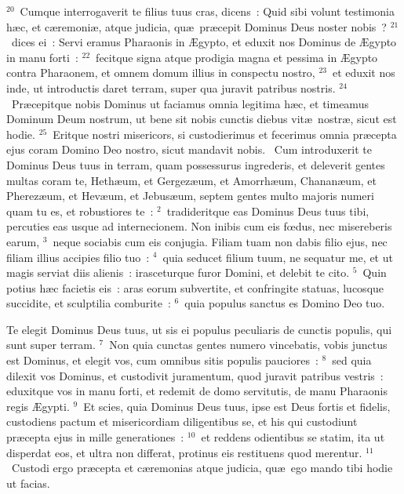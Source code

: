 ${}^{20}$~Cumque interrogaverit te filius tuus cras, dicens~: Quid sibi volunt testimonia h\ae c, et c\ae remoni\ae , atque judicia, qu\ae\ pr\ae cepit Dominus Deus noster nobis~?
${}^{21}$~dices ei~: Servi eramus Pharaonis in \AE gypto, et eduxit nos Dominus de \AE gypto in manu forti~:
${}^{22}$~fecitque signa atque prodigia magna et pessima in \AE gypto contra Pharaonem, et omnem domum illius in conspectu nostro,
${}^{23}$~et eduxit nos inde, ut introductis daret terram, super qua juravit patribus nostris.
${}^{24}$~Pr\ae cepitque nobis Dominus ut faciamus omnia legitima h\ae c, et timeamus Dominum Deum nostrum, ut bene sit nobis cunctis diebus vit\ae\ nostr\ae , sicut est hodie.
${}^{25}$~Eritque nostri misericors, si custodierimus et fecerimus omnia pr\ae cepta ejus coram Domino Deo nostro, sicut mandavit nobis.
~Cum introduxerit te Dominus Deus tuus in terram, quam possessurus ingrederis, et deleverit gentes multas coram te, Heth\ae um, et Gergez\ae um, et Amorrh\ae um, Chanan\ae um, et Pherez\ae um, et Hev\ae um, et Jebus\ae um, septem gentes multo majoris numeri quam tu es, et robustiores te~:
${}^{2}$~tradideritque eas Dominus Deus tuus tibi, percuties eas usque ad internecionem. Non inibis cum eis fœdus, nec misereberis earum,
${}^{3}$~neque sociabis cum eis conjugia. Filiam tuam non dabis filio ejus, nec filiam illius accipies filio tuo~:
${}^{4}$~quia seducet filium tuum, ne sequatur me, et ut magis serviat diis alienis~: irasceturque furor Domini, et delebit te cito.
${}^{5}$~Quin potius h\ae c facietis eis~: aras eorum subvertite, et confringite statuas, lucosque succidite, et sculptilia comburite~:
${}^{6}$~quia populus sanctus es Domino Deo tuo.

 Te elegit Dominus Deus tuus, ut sis ei populus peculiaris de cunctis populis, qui sunt super terram.
${}^{7}$~Non quia cunctas gentes numero vincebatis, vobis junctus est Dominus, et elegit vos, cum omnibus sitis populis pauciores~:
${}^{8}$~sed quia dilexit vos Dominus, et custodivit juramentum, quod juravit patribus vestris~: eduxitque vos in manu forti, et redemit de domo servitutis, de manu Pharaonis regis \AE gypti.
${}^{9}$~Et scies, quia Dominus Deus tuus, ipse est Deus fortis et fidelis, custodiens pactum et misericordiam diligentibus se, et his qui custodiunt pr\ae cepta ejus in mille generationes~:
${}^{10}$~et reddens odientibus se statim, ita ut disperdat eos, et ultra non differat, protinus eis restituens quod merentur.
${}^{11}$~Custodi ergo pr\ae cepta et c\ae remonias atque judicia, qu\ae\ ego mando tibi hodie ut facias.


